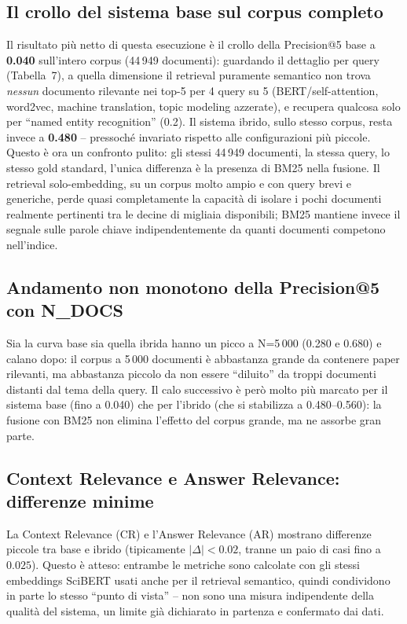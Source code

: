 \documentclass[12pt,a4paper]{article}
\begin{document}
\subsection{Il crollo del sistema base sul corpus completo}

Il risultato pi\`u netto di questa esecuzione \`e il crollo della Precision@5 base a \textbf{0.040} sull'intero corpus (44\,949 documenti): guardando il dettaglio per query (Tabella~7), a quella dimensione il retrieval puramente semantico non trova \emph{nessun} documento rilevante nei top-5 per 4 query su 5 (BERT/self-attention, word2vec, machine translation, topic modeling azzerate), e recupera qualcosa solo per ``named entity recognition'' (0.2). Il sistema ibrido, sullo stesso corpus, resta invece a \textbf{0.480} -- pressoch\'e invariato rispetto alle configurazioni pi\`u piccole. Questo \`e ora un confronto pulito: gli stessi 44\,949 documenti, la stessa query, lo stesso gold standard, l'unica differenza \`e la presenza di BM25 nella fusione. Il retrieval solo-embedding, su un corpus molto ampio e con query brevi e generiche, perde quasi completamente la capacit\`a di isolare i pochi documenti realmente pertinenti tra le decine di migliaia disponibili; BM25 mantiene invece il segnale sulle parole chiave indipendentemente da quanti documenti competono nell'indice.

\subsection{Andamento non monotono della Precision@5 con N\_DOCS}

Sia la curva base sia quella ibrida hanno un picco a N=5\,000 (0.280 e 0.680) e calano dopo: il corpus a 5\,000 documenti \`e abbastanza grande da contenere paper rilevanti, ma abbastanza piccolo da non essere ``diluito'' da troppi documenti distanti dal tema della query. Il calo successivo \`e per\`o molto pi\`u marcato per il sistema base (fino a 0.040) che per l'ibrido (che si stabilizza a 0.480--0.560): la fusione con BM25 non elimina l'effetto del corpus grande, ma ne assorbe gran parte.

\subsection{Context Relevance e Answer Relevance: differenze minime}

La Context Relevance (CR) e l'Answer Relevance (AR) mostrano differenze piccole tra base e ibrido (tipicamente $|\Delta| < 0.02$, tranne un paio di casi fino a $0.025$). Questo \`e atteso: entrambe le metriche sono calcolate con gli stessi embeddings SciBERT usati anche per il retrieval semantico, quindi condividono in parte lo stesso ``punto di vista'' -- non sono una misura indipendente della qualit\`a del sistema, un limite gi\`a dichiarato in partenza e confermato dai dati.
\end{document}
